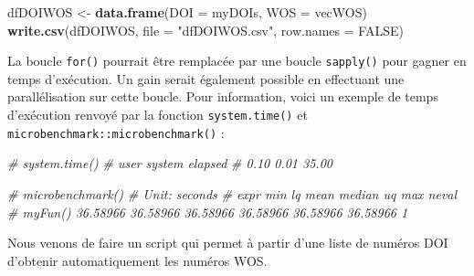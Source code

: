 \documentclass[]{book}
\newenvironment{Shaded}{\begin{snugshade}}{\end{snugshade}}
\newcommand{\CommentTok}[1]{\textcolor[rgb]{0.56,0.35,0.01}{\textit{#1}}}
\newcommand{\DataTypeTok}[1]{\textcolor[rgb]{0.13,0.29,0.53}{#1}}
\newcommand{\KeywordTok}[1]{\textcolor[rgb]{0.13,0.29,0.53}{\textbf{#1}}}
\newcommand{\NormalTok}[1]{#1}
\newcommand{\OtherTok}[1]{\textcolor[rgb]{0.56,0.35,0.01}{#1}}
\newcommand{\StringTok}[1]{\textcolor[rgb]{0.31,0.60,0.02}{#1}}
\begin{document}
\begin{Shaded}
\begin{Highlighting}[]
\NormalTok{dfDOIWOS <-}\StringTok{ }\KeywordTok{data.frame}\NormalTok{(}\DataTypeTok{DOI =}\NormalTok{ myDOIs, }\DataTypeTok{WOS =}\NormalTok{ vecWOS)}
\KeywordTok{write.csv}\NormalTok{(dfDOIWOS, }\DataTypeTok{file =} \StringTok{"dfDOIWOS.csv"}\NormalTok{, }\DataTypeTok{row.names =} \OtherTok{FALSE}\NormalTok{)}
\end{Highlighting}
\end{Shaded}

La boucle \texttt{for()} pourrait être remplacée par une boucle \texttt{sapply()} pour gagner en temps d'exécution. Un gain serait également possible en effectuant une parallélisation sur cette boucle. Pour information, voici un exemple de temps d'exécution renvoyé par la fonction \texttt{system.time()} et \texttt{microbenchmark::microbenchmark()} :

\begin{Shaded}
\begin{Highlighting}[]
\CommentTok{# system.time()}
\CommentTok{#   user  system elapsed}
\CommentTok{#   0.10    0.01   35.00}

\CommentTok{# microbenchmark()}
\CommentTok{# Unit: seconds}
\CommentTok{#     expr      min       lq     mean   median       uq      max neval}
\CommentTok{#  myFun() 36.58966 36.58966 36.58966 36.58966 36.58966 36.58966     1}
\end{Highlighting}
\end{Shaded}

Nous venons de faire un script qui permet à partir d'une liste de numéros DOI d'obtenir automatiquement les numéros WOS.
\end{document}
